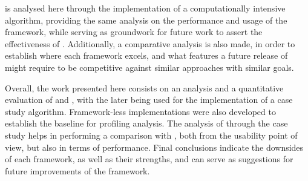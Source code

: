 \documentclass[main.tex]{subfiles}
\begin{document}
\starpu is analysed here through the implementation of a computationally intensive algorithm, providing the same analysis on the performance and usage of the framework, while serving as groundwork for future work to assert the effectiveness of \gama. Additionally, a comparative analysis is also made, in order to establish where each framework excels, and what features a future release of \gama might require to be competitive against similar approaches with similar goals.

Overall, the work presented here consists on an analysis and a quantitative evaluation of \gama and \starpu, with the later being used for the implementation of a case study algorithm. Framework-less implementations were also developed to establish the baseline for profiling analysis. The analysis of \starpu through the case study helps in performing a comparison with \gama, both from the usability point of view, but also in terms of performance. Final conclusions indicate the downsides of each framework, as well as their strengths, and can serve as suggestions for future improvements of the \gama framework.
\end{document}
